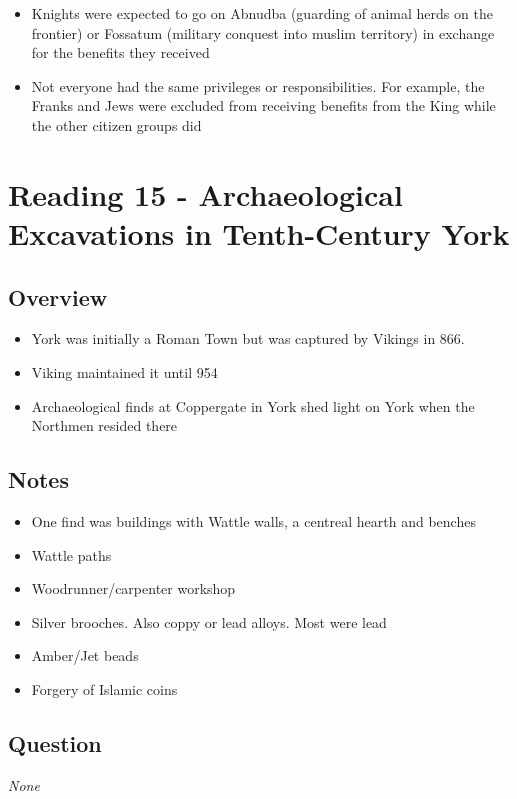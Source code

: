 \documentclass[12pt]{article}
\begin{document}
\begin{itemize}
	\item Knights were expected to go on Abnudba (guarding of animal herds on the frontier) or Fossatum (military conquest into muslim territory) in exchange for the benefits they received
	\item Not everyone had the same privileges or responsibilities. For example, the Franks and Jews were excluded from receiving benefits from the King while the other citizen groups did
\end{itemize}


\section*{Reading 15 - Archaeological Excavations in Tenth-Century York}

\subsection*{Overview}
\begin{itemize}
	\item York was initially a Roman Town but was captured by Vikings in 866.
	\item Viking maintained it until 954
	\item Archaeological finds at Coppergate in York shed light on York when the Northmen resided there
\end{itemize}

\subsection*{Notes}
\begin{itemize}
	\item One find was buildings with Wattle walls, a centreal hearth and benches
	\item Wattle paths
	\item Woodrunner/carpenter workshop
	\item Silver brooches. Also coppy or lead alloys. Most were lead
	\item Amber/Jet beads
	\item Forgery of Islamic coins
\end{itemize}

\subsection*{Question}
	\textit{None}
	
\end{document}
